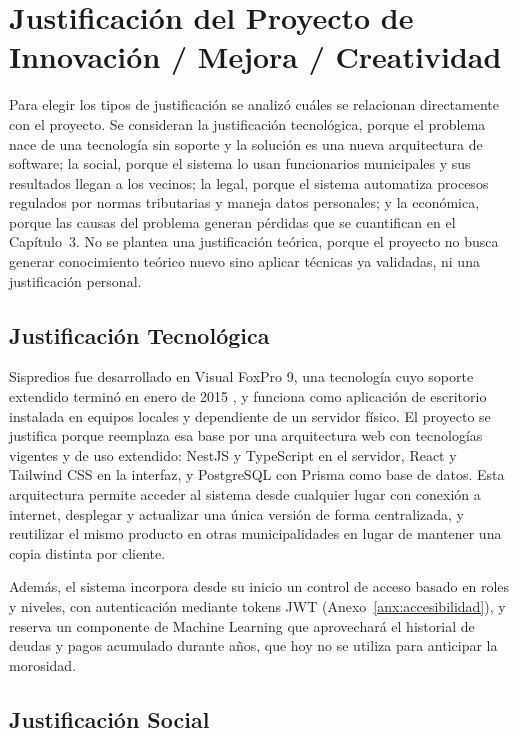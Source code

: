 \documentclass[12pt,a4paper]{report}
\begin{document}
\section{Justificación del Proyecto de Innovación / Mejora / Creatividad}

Para elegir los tipos de justificación se analizó cuáles se relacionan directamente con el proyecto. Se consideran la justificación tecnológica, porque el problema nace de una tecnología sin soporte y la solución es una nueva arquitectura de software; la social, porque el sistema lo usan funcionarios municipales y sus resultados llegan a los vecinos; la legal, porque el sistema automatiza procesos regulados por normas tributarias y maneja datos personales; y la económica, porque las causas del problema generan pérdidas que se cuantifican en el Capítulo~3. No se plantea una justificación teórica, porque el proyecto no busca generar conocimiento teórico nuevo sino aplicar técnicas ya validadas, ni una justificación personal.

\subsection{Justificación Tecnológica}

Sispredios fue desarrollado en Visual FoxPro 9, una tecnología cuyo soporte extendido terminó en enero de 2015 \parencite{taft2007}, y funciona como aplicación de escritorio instalada en equipos locales y dependiente de un servidor físico. El proyecto se justifica porque reemplaza esa base por una arquitectura web con tecnologías vigentes y de uso extendido: NestJS y TypeScript en el servidor, React y Tailwind CSS en la interfaz, y PostgreSQL con Prisma como base de datos. Esta arquitectura permite acceder al sistema desde cualquier lugar con conexión a internet, desplegar y actualizar una única versión de forma centralizada, y reutilizar el mismo producto en otras municipalidades en lugar de mantener una copia distinta por cliente.

Además, el sistema incorpora desde su inicio un control de acceso basado en roles y niveles, con autenticación mediante tokens JWT (Anexo~\ref{anx:accesibilidad}), y reserva un componente de Machine Learning que aprovechará el historial de deudas y pagos acumulado durante años, que hoy no se utiliza para anticipar la morosidad.

\subsection{Justificación Social}
\end{document}
